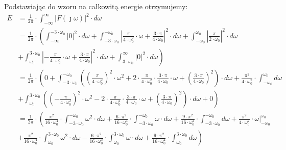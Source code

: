 \begin{task}
Podstawiając do wzoru na całkowitą energie otrzymujemy:
\begin{align*}
E &= \frac{1}{2\pi} \cdot \int_{-\infty}^{\infty} \left|F(\jmath \omega)\right|^2 \cdot d\omega\\
&= \frac{1}{2\pi} \cdot \left(\int_{-\infty}^{-3 \cdot \omega_0} \left|0\right|^2 \cdot d\omega + \int_{-3 \cdot \omega_0}^{-\omega_0} \left|\frac{\pi}{4 \cdot \omega_0^2} \cdot \omega + \frac{3 \cdot \pi}{4 \cdot \omega_0}\right|^2 \cdot d\omega + \int_{-\omega_0}^{\omega_0} \left|\frac{\pi}{2 \cdot \omega_0}\right|^2 \cdot d\omega\right.\\
&\left.+\int_{\omega_0}^{3 \cdot \omega_0} \left|-\frac{\pi}{4 \cdot \omega_0^2} \cdot \omega + \frac{3 \cdot \pi}{4 \cdot \omega_0}\right|^2 \cdot d\omega + \int_{3 \cdot \omega_0}^{\infty} \left|0\right|^2 \cdot d\omega \right)\\
&= \frac{1}{2\pi} \cdot \left(0 + \int_{-3 \cdot \omega_0}^{-\omega_0} \left(\left(\frac{\pi}{4 \cdot \omega_0^2}\right)^2 \cdot \omega^2 + 2 \cdot \frac{\pi}{4 \cdot \omega_0^2} \cdot \frac{3 \cdot \pi}{4 \cdot \omega_0} \cdot \omega + \left(\frac{3 \cdot \pi}{4 \cdot \omega_0}\right)^2\right) \cdot d\omega + \frac{\pi^2}{4 \cdot \omega_0^2}\cdot \int_{-\omega_0}^{\omega_0} d\omega\right.\\
&\left.+ \int_{\omega_0}^{3 \cdot \omega_0} \left(\left(-\frac{\pi}{4 \cdot \omega_0^2}\right)^2 \cdot \omega^2 - 2 \cdot \frac{\pi}{4 \cdot \omega_0^2} \cdot \frac{3 \cdot \pi}{4 \cdot \omega_0} \cdot \omega + \left(\frac{3 \cdot \pi}{4 \cdot \omega_0}\right)^2\right) \cdot d\omega + 0 \right)\\
&= \frac{1}{2\pi} \cdot \left(\frac{\pi^2}{16 \cdot \omega_0^4} \cdot \int_{-3 \cdot \omega_0}^{-\omega_0} \omega^2 \cdot d\omega + \frac{6 \cdot \pi^2}{16 \cdot \omega_0^3} \cdot \int_{-3 \cdot \omega_0}^{-\omega_0} \omega \cdot d\omega + \frac{9 \cdot \pi^2}{16 \cdot \omega_0^2} \cdot \int_{-3 \cdot \omega_0}^{-\omega_0} d\omega + \frac{\pi^2}{4 \cdot \omega_0^2}\cdot \left. \omega\right|_{-\omega_0}^{\omega_0}\right.\\
&\left.+ \frac{\pi^2}{16 \cdot \omega_0^4} \cdot \int_{\omega_0}^{3 \cdot \omega_0} \omega^2 \cdot d\omega - \frac{6 \cdot \pi^2}{16 \cdot \omega_0^3} \cdot \int_{\omega_0}^{3 \cdot \omega_0} \omega \cdot d\omega + \frac{9 \cdot \pi^2}{16 \cdot \omega_0^2} \cdot \int_{\omega_0}^{3 \cdot \omega_0} d\omega \right)\\
\end{align*}





\end{task}
